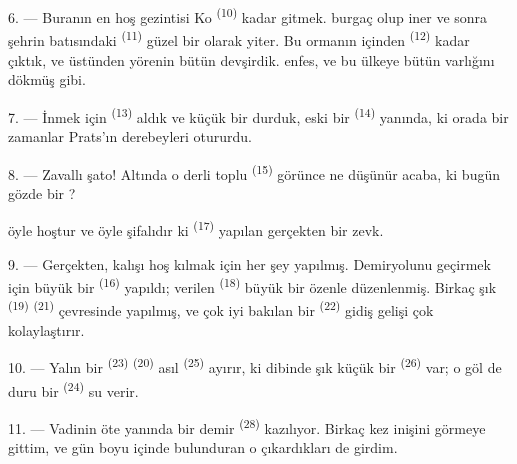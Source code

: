 \VUsaut{3.0mm}
\VUsaut{3.0mm}

6. --- Buranın en hoş gezintisi Ko  \textsuperscript{(10)}
kadar gitmek.  burgaç olup iner ve sonra şehrin
batısındaki  \textsuperscript{(11)} güzel bir
 olarak yiter. Bu ormanın içinden 
\textsuperscript{(12)} kadar çıktık, ve  üstünden yörenin
bütün  devşirdik.  enfes, ve
 bu ülkeye bütün varlığını dökmüş gibi.

7. --- İnmek için  \textsuperscript{(13)} aldık ve küçük bir
 durduk, eski bir 
 \textsuperscript{(14)} yanında, ki orada bir zamanlar
Prats'ın derebeyleri otururdu.

8. --- Zavallı şato! Altında o derli toplu 
\textsuperscript{(15)} görünce ne düşünür acaba, ki bugün gözde bir
?

 öyle hoştur ve  öyle şifalıdır ki
 \textsuperscript{(17)} yapılan  gerçekten bir
zevk.

\VUsaut{3.0mm}
\VUsaut{3.0mm}

9. --- Gerçekten, kalışı hoş kılmak için her şey yapılmış. Demiryolunu
geçirmek için büyük bir  \textsuperscript{(16)} yapıldı;
 verilen  
\textsuperscript{(18)} büyük bir özenle düzenlenmiş. Birkaç şık
 \textsuperscript{(19)}  \textsuperscript{(21)}
çevresinde yapılmış, ve çok iyi bakılan bir 
\textsuperscript{(22)} gidiş gelişi çok kolaylaştırır.

10. --- Yalın bir  \textsuperscript{(23)} 
\textsuperscript{(20)} asıl  \textsuperscript{(25)} ayırır, ki
dibinde şık küçük bir  \textsuperscript{(26)} var; o göl de duru
bir  \textsuperscript{(24)} su verir.

11. --- Vadinin öte yanında bir demir  \textsuperscript{(28)}
kazılıyor. Birkaç kez   inişini görmeye
gittim, ve gün boyu  içinde bulunduran o 
çıkardıkları  de girdim.

